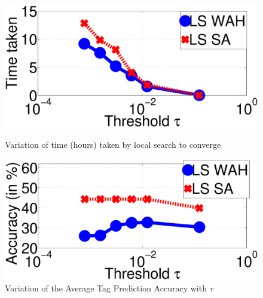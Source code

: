 \begin{figure}[t!]
\centering
  \includegraphics[width=0.65\linewidth]{TagTree/TimeNIterationsWithTau}
  \caption{Variation of time (hours) taken by local search to converge}
  \label{fig:TauTimetaken}
  \includegraphics[width=0.65\linewidth]{TagTree/RebuttalAccuracyWithTauNew}
  \caption{Variation of the Average Tag Prediction Accuracy with $\tau$}
  \label{fig:TauAccuracy}
\end{figure}

